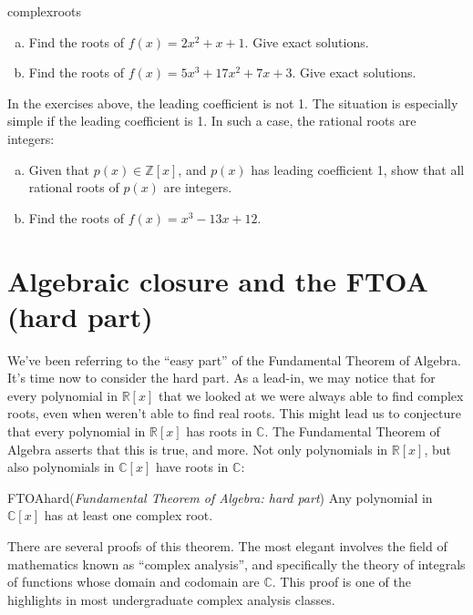 \begin{exercise}{complexroots}
\begin {enumerate}[(a)]
\item
Find the roots of $f(x)=2x^2+x+1$. Give exact solutions.
\item
Find the roots of $f(x)=5x^3+17x^2+7x+3$. Give exact solutions. 
\end{enumerate}
\end{exercise}
 
In the exercises above, the leading coefficient is not 1. The situation is especially simple if the leading coefficient is 1. In such a case, the rational  roots are integers:

\begin{exercise}{}
\begin{enumerate}[(a)]
\item
Given that $p(x)  \in \mathbb{Z}[x]$, and $p(x)$ has leading coefficient 1, show that all rational roots of $p(x)$ are integers.
\item
Find the roots of $f(x)=x^3-13x+12$.
\end{enumerate}
\end{exercise}


\section{Algebraic closure and the FTOA (hard part)}

We've been referring to the ``easy part'' of the Fundamental Theorem of Algebra. It's time now to consider the hard part. As a lead-in, we may notice that  for every polynomial in $\mathbb{R}[x]$ that we looked at we were always able to find complex roots, even when weren't able to find real roots. This might lead us to conjecture that every polynomial in $\mathbb{R}[x]$ has roots in $\mathbb{C}$.  The Fundamental Theorem of Algebra asserts that this is true, and more.  Not only polynomials in $\mathbb{R}[x]$, but also polynomials in $\mathbb{C}[x]$ have roots in $\mathbb{C}$:  

\begin{prop}{FTOAhard}(\emph{Fundamental Theorem of Algebra: hard part})
Any polynomial in $\mathbb{C}[x]$ has at least one complex root.
\end {prop}

There are several proofs of this theorem. The most elegant involves the field of mathematics known as ``complex analysis'', and specifically the theory of integrals of functions whose domain and codomain are $\mathbb{C}$.  This proof is one of the highlights in most undergraduate complex analysis classes.

